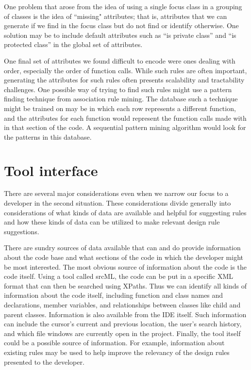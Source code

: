\documentclass[12pt]{article}
\begin{document}
One problem that arose from the idea of using a single focus class in a grouping of classes is the idea of  ``missing" attributes; that is, attributes that we can generate if we find in the focus class but do not find or identify otherwise. One solution may be to include default attributes such as “is private class” and “is protected class” in the global set of attributes.

One final set of attributes we found difficult to encode were ones dealing with order, especially the order of function calls. While such rules are often important, generating the attributes for such rules often presents scalability and tractability challenges. One possible way of trying to find such rules might use a pattern finding technique from association rule mining. The database such a technique might be trained on may be in which each row represents a different function, and the attributes for each function would represent the function calls made with in that section of the code. A sequential pattern mining algorithm would look for the patterns in this database.



\section{Tool interface} \label{toolInterface}
There are several major considerations even when we narrow our focus to a developer in the second situation. These considerations divide generally into considerations of what kinds of data are available and helpful for suggesting rules and how these kinds of data can be utilized to make relevant design rule suggestions.

There are sundry sources of data available that can and do provide information about the code base and what sections of the code in which the developer might be most interested. The most obvious source of information about the code is the code itself. Using a tool called srcML, the code can be put in a specific XML format that can then be searched using XPaths. Thus we can identify all kinds of information about the code itself, including function and class names and declarations, member variables, and relationships between classes like child and parent classes. Information is also available from the IDE itself. Such information can include the cursor's current and previous location, the user's search history, and which file windows are currently open in the project. Finally, the tool itself could be a possible source of information. For example, information about existing rules may be used to help improve the relevancy of the design rules presented to the developer.
\end{document}
